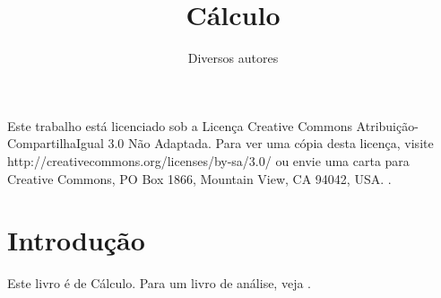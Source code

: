 \documentclass[a4paper]{book}
\title{Cálculo}
\author{Diversos autores}
\newcommand{\openepigraph}[2]{%
  \begin{fullwidth}
  \sffamily\normalsize  %
  \noindent\allcaps{#1}\\%
  \noindent\begin{flushright}\small {#2}\end{flushright}%
  \end{fullwidth}
}
\newcommand{\blankpage}{\newpage\hbox{}\thispagestyle{empty}\newpage}
\begin{document}
\frontmatter







\maketitle


\newpage

\par Este trabalho está licenciado sob a Licença Creative Commons Atribuição-CompartilhaIgual 3.0 Não Adaptada. Para ver uma cópia desta licença, visite http://creativecommons.org/licenses/by-sa/3.0/ ou envie uma carta para Creative Commons, PO Box 1866, Mountain View, CA 94042, USA.
.






\chapter*{Introdução}

Este livro é de Cálculo. Para um livro de análise, veja \cite{Rudin}.
\end{document}
